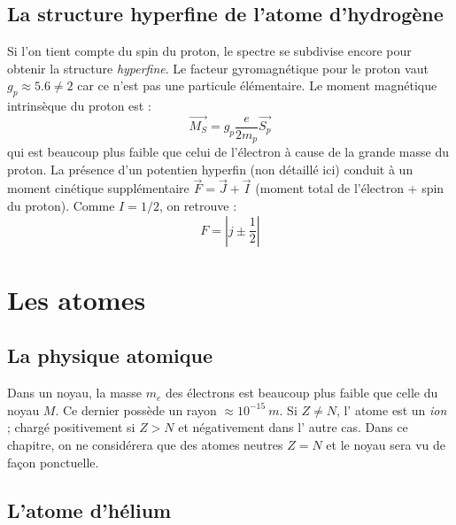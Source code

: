 \documentclass	[11pt, a4paper, openany]{book}
\begin{document}
	\section{La structure hyperfine de l'atome d'hydrogène}
	Si l'on tient compte du spin du proton, le spectre se subdivise encore pour obtenir
	la structure \textit{hyperfine}. Le facteur gyromagnétique pour le proton vaut $
	g_p \approx 5.6 \neq 2$ car ce n'est pas une particule élémentaire. Le moment 
	magnétique intrinsèque du proton est :
	\begin{equation}
	\vec{M_S} = g_p \frac{e}{2m_p}\vec{S_p}
	\end{equation}
	qui est beaucoup plus faible que celui de l'électron à cause de la grande masse du
	proton. La présence d'un potentien hyperfin (non détaillé ici) conduit à un moment
	cinétique supplémentaire $\vec{F}=\vec{J}+\vec{I}$ (moment total de l'électron +
	spin du proton). Comme $I = 1/2$, on retrouve :
	\begin{equation}
	F = \left|j\pm\frac{1}{2}\right|
	\end{equation}
	
	
	
	
	
	


\chapter{Les atomes}
\section{La physique atomique}
    Dans un noyau, la masse $m_e$ des électrons est beaucoup plus faible que celle du
    noyau $M$. Ce dernier possède un rayon $\approx 10^{-15}\ m$. Si $Z \neq N$, l'
    atome est un \textit{ion} ; chargé positivement si $Z>N$ et négativement dans l'
    autre cas. Dans ce chapitre, on ne considérera que des atomes neutres $Z=N$ et le
    noyau sera vu de façon ponctuelle.
    
\section{L'atome d'hélium}
\end{document}

